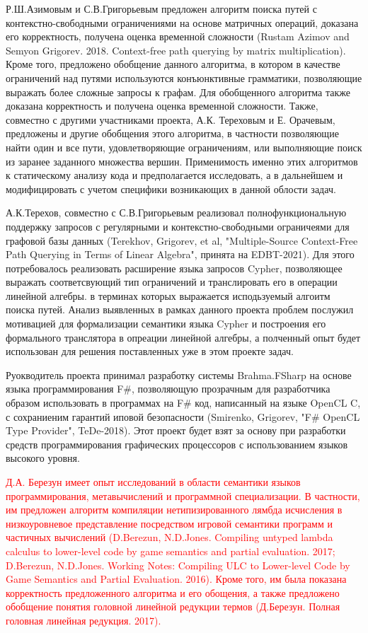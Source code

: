 \documentclass[12pt]{article}  %
\theoremstyle{remark}
\newcommand{\checkme}[1]{\textcolor{red}{#1}}
\begin{document}
Р.Ш.Азимовым и С.В.Григорьевым предложен алгоритм поиска путей с контекстно-свободными ограничениями на основе матричных операций, доказана его корректность, получена оценка временной сложности (Rustam Azimov and Semyon Grigorev. 2018. Context-free path querying by matrix multiplication). Кроме того, предложено обобщение данного алгоритма, в котором в качестве ограничений над путями используются конъюнктивные грамматики, позволяющие выражать более сложные запросы к графам. Для обобщенного алгоритма также доказана корректность и получена оценка временной сложности. Также, совместно с другими участниками проекта, А.К. Тереховым и Е. Орачевым, предложены и другие обобщения этого алгоритма, в частности позволяющие найти один и все пути, удовлетворяющие ограничениям, или выполняющие поиск из заранее заданного множества вершин. Применимость именно этих алгоритмов к статическому анализу кода и предполагается исследовать, а в дальнейшем и модифицировать с учетом специфики возникающих в данной облости задач.

А.К.Терехов, совместно с С.В.Григорьевым реализовал полнофункциональную поддержку запросов с регулярными и контекстно-свободными ограничеями для графовой базы данных (Terekhov, Grigorev, et al, "Multiple-Source Context-Free Path Querying in Terms of Linear Algebra", принята на EDBT-2021). Для этого потребовалось реализовать расширение языка запросов Cypher, позволяющее выражать соответсвующий тип ограничений и транслировать его в операции линейной алгебры. в терминах которых выражается исподьзуемый алгоитм поиска путей. Анализ выявленных в рамках данного проекта проблем послужил мотивацией для формализации семантики языка Cypher и построения его формального транслятора в опреации линейной алгебры, а полченный опыт будет использован для решения поставленных уже в этом проекте задач. 

Руокводитель проекта принимал разработку системы Brahma.FSharp на основе языка программирования F\#, позволяющую прозрачным для разработчика образом использовать в программах на F\# код, написанный на языке OpenCL C, с сохраниеним гарантий иповой безопасности (Smirenko, Grigorev, "F\# OpenCL Type Provider", TeDe-2018). Этот проект будет взят за основу при разработки средств программирования графических процессоров с использованием языков высокого уровня. 

\checkme{Д.А. Березун имеет опыт исследований в области семантики языков программирования, метавычислений и
программной специализации. В частности, им предложен алгоритм компиляции нетипизированного лямбда исчисления в низкоуровневое представление посредством игровой семантики программ и частичных вычислений (D.Berezun, N.D.Jones. Compiling untyped lambda calculus to lower-level code by game semantics and partial evaluation. 2017; D.Berezun, N.D.Jones. Working Notes: Compiling ULC to Lower-level Code by Game Semantics and Partial Evaluation. 2016). Кроме того, им была показана корректность предложенного алгоритма и его обощения, а также предложено обобщение понятия головной линейной редукции термов (Д.Березун. Полная головная линейная редукция. 2017).}
\end{document}
